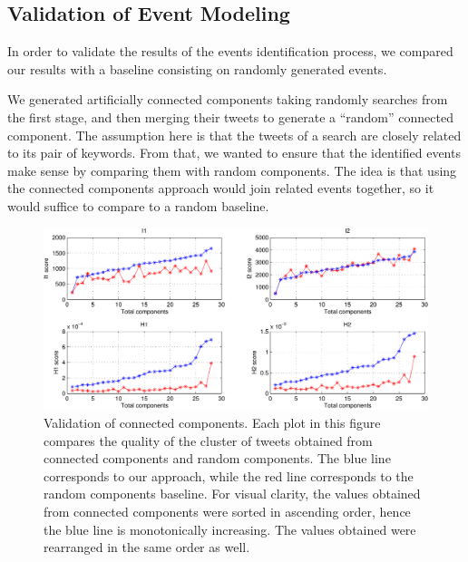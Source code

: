 \subsection{Validation of Event Modeling}\label{sub:valcoll}

In order to validate the results of the events identification process, we
compared our results with a baseline consisting on randomly generated events.

We generated artificially connected components taking randomly searches from the
first stage, and then merging their tweets to generate a ``random'' connected
component. 
%
The assumption here is that the tweets of a search are closely related to its
pair of keywords. 
%
From that, we wanted to ensure that the identified events make sense by
comparing them with random components. 
%
The idea is that using the connected components approach would join related
events together, so it would suffice to compare to a random baseline.

\begin{figure}
\begin{center}
\includegraphics[width=.8\textwidth]{figures/data/connected_components_validation2.pdf}
\caption[Validation of connected components] {Validation of connected
  components. Each plot in this figure compares the quality of the cluster of
  tweets obtained from connected components and random components. The blue line
  corresponds to our approach, while the red line corresponds to the random
  components baseline. For visual clarity, the values obtained from connected
  components were sorted in ascending order, hence the blue line is
  monotonically increasing. The values obtained were rearranged in the same
  order as well.}\label{fig:connected_components_validation} 
\end{center}
\end{figure}

